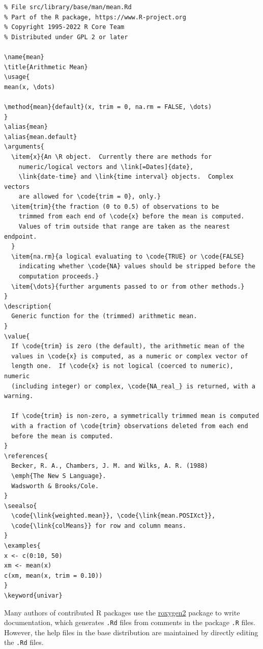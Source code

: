 \documentclass[
]{book}
\begin{document}
\begin{verbatim}
% File src/library/base/man/mean.Rd
% Part of the R package, https://www.R-project.org
% Copyright 1995-2022 R Core Team
% Distributed under GPL 2 or later

\name{mean}
\title{Arithmetic Mean}
\usage{
mean(x, \dots)

\method{mean}{default}(x, trim = 0, na.rm = FALSE, \dots)
}
\alias{mean}
\alias{mean.default}
\arguments{
  \item{x}{An \R object.  Currently there are methods for
    numeric/logical vectors and \link[=Dates]{date},
    \link{date-time} and \link{time interval} objects.  Complex vectors
    are allowed for \code{trim = 0}, only.}
  \item{trim}{the fraction (0 to 0.5) of observations to be
    trimmed from each end of \code{x} before the mean is computed.
    Values of trim outside that range are taken as the nearest endpoint.
  }
  \item{na.rm}{a logical evaluating to \code{TRUE} or \code{FALSE}
    indicating whether \code{NA} values should be stripped before the
    computation proceeds.} 
  \item{\dots}{further arguments passed to or from other methods.}
}
\description{
  Generic function for the (trimmed) arithmetic mean.
}
\value{
  If \code{trim} is zero (the default), the arithmetic mean of the
  values in \code{x} is computed, as a numeric or complex vector of
  length one.  If \code{x} is not logical (coerced to numeric), numeric
  (including integer) or complex, \code{NA_real_} is returned, with a warning.

  If \code{trim} is non-zero, a symmetrically trimmed mean is computed
  with a fraction of \code{trim} observations deleted from each end
  before the mean is computed.
}
\references{
  Becker, R. A., Chambers, J. M. and Wilks, A. R. (1988)
  \emph{The New S Language}.
  Wadsworth & Brooks/Cole.
}
\seealso{
  \code{\link{weighted.mean}}, \code{\link{mean.POSIXct}},
  \code{\link{colMeans}} for row and column means.
}
\examples{
x <- c(0:10, 50)
xm <- mean(x)
c(xm, mean(x, trim = 0.10))
}
\keyword{univar}
\end{verbatim}

Many authors of contributed R packages use the \href{https://cran.r-project.org/package=roxygen2}{roxygen2} package to write documentation, which generates \texttt{.Rd} files from comments in the package \texttt{.R} files. However, the help files in the base distribution are maintained by directly editing the \texttt{.Rd} files.
\end{document}
